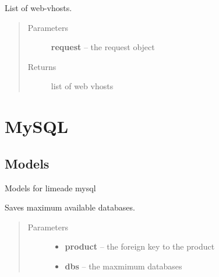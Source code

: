 \documentclass[letterpaper,10pt,english]{sphinxmanual}
\begin{document}

\begin{fulllineitems}
\label{api/web:limeade.web.views.vhost_list}
List of web-vhosts.
\begin{quote}\begin{description}
\item[{Parameters}] \leavevmode
\textbf{request} -- the request object

\item[{Returns}] \leavevmode
list of web vhosts

\end{description}\end{quote}

\end{fulllineitems}



\section{MySQL}
\label{api/mysql::doc}\label{api/mysql:mysql}

\subsection{Models}
\label{api/mysql:models}\label{api/mysql:module-limeade.mysql.models}
Models for limeade mysql

\begin{fulllineitems}
\label{api/mysql:limeade.mysql.models.Limitset}
Saves maximum available databases.
\begin{quote}\begin{description}
\item[{Parameters}] \leavevmode\begin{itemize}
\item {} 
\textbf{product} -- the foreign key to the product

\item {} 
\textbf{dbs} -- the maxmimum databases

\end{itemize}

\end{description}\end{quote}

\end{fulllineitems}
\end{document}
